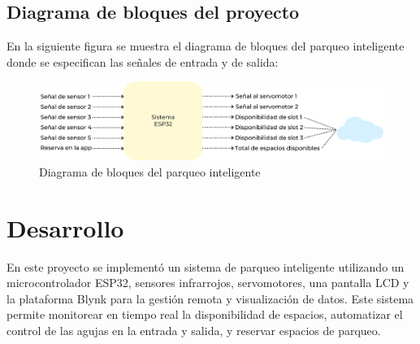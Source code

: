 \documentclass[12pt,a4paper]{article}
\begin{document}
\subsection{Diagrama de bloques del proyecto}
En la siguiente figura se muestra el diagrama de bloques del parqueo inteligente donde se especifican las señales de entrada y de salida:

\begin{figure}[H]
    \centering
    \includegraphics[width=0.85\linewidth]{Imagenes/block.png}
    \caption{Diagrama de bloques del parqueo inteligente}
    \label{fig:7}
\end{figure}
\section{Desarrollo}
En este proyecto se implementó un sistema de parqueo inteligente utilizando un microcontrolador ESP32, sensores infrarrojos, servomotores, una pantalla LCD y la plataforma Blynk para la gestión remota y visualización de datos. Este sistema permite monitorear en tiempo real la disponibilidad de espacios, automatizar el control de las agujas en la entrada y salida, y reservar espacios de parqueo.
\end{document}
